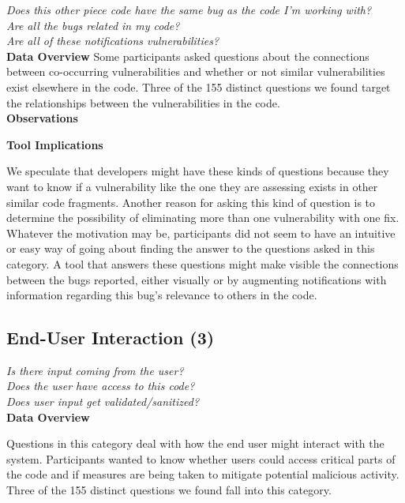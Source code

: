 \documentclass[conference]{IEEEtran}
\begin{document}
\noindent\emph{Does this other piece code have the same bug as the code I'm working with?} \\
\emph{Are all the bugs related in my code?} \\
\emph{Are all of these notifications vulnerabilities?} \\


\noindent\textbf{Data Overview}
Some participants asked questions about the connections between co-occurring vulnerabilities and whether or not similar vulnerabilities exist elsewhere in the code. 
Three of the 155 distinct questions we found target the relationships between the vulnerabilities in the code. 
\\

\noindent\textbf{Observations}

\noindent\textbf{Tool Implications}

We speculate that developers might have these kinds of questions because they want to know if a vulnerability like the one they are assessing exists in other similar code fragments.
Another reason for asking this kind of question is to determine the possibility of eliminating more than one vulnerability with one fix. 
Whatever the motivation may be, participants did not seem to have an intuitive or easy way of going about finding the answer to the questions asked in this category.
A tool that answers these questions might make visible the connections between the bugs reported, either visually or by augmenting notifications with information regarding this bug's relevance to others in the code.


\noindent\subsection{\textbf{End-User Interaction (3)}}
\label{eui}

\noindent\emph{Is there input coming from the user?} \\
\emph{Does the user have access to this code?} \\
\emph{Does user input get validated/sanitized?} \\


\noindent\textbf{Data Overview}

Questions in this category deal with how the end user might interact with the system. 
Participants wanted to know whether users could access critical parts of the code and if measures are being taken to mitigate potential malicious activity. 
Three of the 155 distinct questions we found fall into this category.
\\
\end{document}
